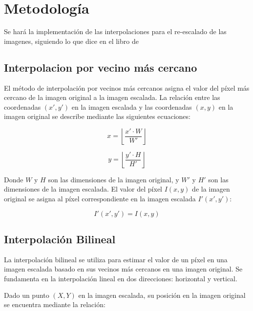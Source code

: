 \documentclass[11pt, letterpaper]{article}
\begin{document}
	
	\newpage
	
	\section{Metodología}

	Se hará la implementación de las interpolaciones para el re-escalado de las imagenes, siguiendo lo que dice en el libro de \cite{gonzalez2018digital}
	
	\subsection{Interpolacion por vecino más cercano}
	
	El método de interpolación por vecinos más cercanos asigna el valor del píxel más cercano de la imagen original a la imagen escalada. La relación entre las coordenadas \( (x', y') \) en la imagen escalada y las coordenadas \( (x, y) \) en la imagen original se describe mediante las siguientes ecuaciones:
	
	\begin{equation}
		x = \left\lfloor \frac{x' \cdot W}{W'} \right\rfloor
	\end{equation}
	
	\begin{equation}
		y = \left\lfloor \frac{y' \cdot H}{H'} \right\rfloor
	\end{equation}
	
	Donde \( W \) y \( H \) son las dimensiones de la imagen original, y \( W' \) y \( H' \) son las dimensiones de la imagen escalada. El valor del píxel \( I(x, y) \) de la imagen original se asigna al píxel correspondiente en la imagen escalada \( I'(x', y') \):
	
	\begin{equation}
		I'(x', y') = I(x, y)
	\end{equation}
	
	\subsection{Interpolación Bilineal}
	
	La interpolación bilineal se utiliza para estimar el valor de un píxel en una imagen escalada basado en sus vecinos más cercanos en una imagen original. Se fundamenta en la interpolación lineal en dos direcciones: horizontal y vertical.
	
	Dado un punto $(X, Y)$ en la imagen escalada, su posición en la imagen original se encuentra mediante la relación:
	
\end{document}
